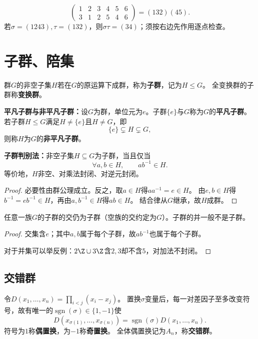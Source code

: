 \begin{example}
\[
\begin{pmatrix}1&2&3&4&5&6\\3&1&2&5&4&6\end{pmatrix}=(132)(45).
\]
若$\sigma=(1243),\tau=(132)$，则$\sigma\tau=(34)$；须按右边先作用逐点检查。
\end{example}

\section{子群、陪集}


\begin{definition}
\label{p2:concept:c1-l247}群$G$的非空子集$H$若在$G$的原运算下成群，称为\textbf{子群}，记为$H\leq G$。
\label{p2:concept:c1-l248}全变换群的子群称\textbf{变换群}。
\end{definition}

\begin{definition}
\label{p2:concept:c1-l252}\textbf{平凡子群与非平凡子群：}设$G$为群，单位元为$e$。子群$\{e\}$与$G$称为$G$的\textbf{平凡子群}。
\label{p2:concept:c1-l253}若子群$H\leq G$满足$H\neq\{e\}$且$H\neq G$，即
\[
\{e\}\subsetneq H\subsetneq G,
\]
则称$H$为$G$的\textbf{非平凡子群}。
\end{definition}

\begin{theorem}
\textbf{子群判别法：}非空子集$H\subseteq G$为子群，当且仅当
\[
\forall a,b\in H,\qquad ab^{-1}\in H.
\]
等价地，$H$非空、对乘法封闭、对逆元封闭。
\end{theorem}
\begin{proof}
必要性由群公理成立。反之，取$a\in H$得$aa^{-1}=e\in H$。
由$e,b\in H$得$b^{-1}=eb^{-1}\in H$，再由$a,b^{-1}\in H$得$ab\in H$。
结合律从$G$继承，故$H$成群。
\end{proof}

\begin{proposition}
任意一族$G$的子群的交仍为子群（空族的交约定为$G$）。子群的并一般不是子群。
\end{proposition}
\begin{proof}
交集含$e$；其中$a,b$属于每个子群，故$ab^{-1}$也属于每个子群。

对于并集可以举反例：$2\Z\cup3\Z$含$2,3$却不含$5$，对加法不封闭。
\end{proof}

\subsection*{交错群}
\begin{definition}
\label{p2:concept:c1-l284}令$D(x_1,\ldots,x_n)=\prod_{i<j}(x_i-x_j)$。
置换$\sigma$变量后，每一对差因子至多改变符号，故有唯一的$\operatorname{sgn}(\sigma)\in\{1,-1\}$使
\[
D(x_{\sigma(1)},\ldots,x_{\sigma(n)})=\operatorname{sgn}(\sigma)D(x_1,\ldots,x_n).
\]
\label{p2:concept:c1-l289}符号为$1$称\textbf{偶置换}，为$-1$称\textbf{奇置换}。
\label{p2:concept:c1-l290}全体偶置换记为$A_n$，称\textbf{交错群}。
\end{definition}

